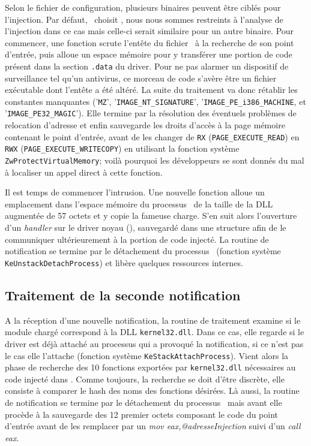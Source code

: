 Selon le fichier de configuration, plusieurs binaires peuvent être ciblés pour l'injection. Par défaut, \Duqu\ choisit \service, nous nous sommes restreints à l'analyse de l'injection dans ce cas mais celle-ci serait similaire pour un autre binaire.
Pour commencer, une fonction scrute l'entête du fichier \service\ à la recherche de son point d'entrée, puis alloue un espace mémoire pour y transférer une portion de code présent dans la section \texttt{.data} du driver. Pour ne pas alarmer un dispositif de surveillance tel qu'un antivirus, ce morceau de code s'avère être un fichier exécutable dont l'entête a été altéré. La suite du traitement va donc rétablir les constantes manquantes ('\texttt{MZ}', '\texttt{IMAGE\_NT\_SIGNATURE}', '\texttt{IMAGE\_PE\_i386\_MACHINE}, et '\texttt{IMAGE\_PE32\_MAGIC}'). Elle termine par la résolution des éventuels problèmes de relocation d'adresse et enfin sauvegarde les droits d'accès à la page mémoire contenant le point d'entrée, avant de les changer de \texttt{RX} (\texttt{PAGE\_EXECUTE\_READ}) en \texttt{RWX} (\texttt{PAGE\_EXECUTE\_WRITECOPY}) en utilisant la fonction système \texttt{ZwProtectVirtualMemory}; voilà pourquoi les développeurs se sont donnés du mal à localiser un appel direct à cette fonction.

Il est temps de commencer l'intrusion. Une nouvelle fonction alloue un emplacement dans l'espace mémoire du processus \service\ 
de la taille de la DLL augmentée de 57 octets et y copie la fameuse charge. S'en suit alors l'ouverture d'un \emph{handler} sur le driver noyau (\driver), sauvegardé dans une structure afin de le communiquer ultérieurement à la portion de code injecté. La routine de notification se termine par le détachement du processus \service\ (fonction système \texttt{KeUnstackDetachProcess}) et libère quelques ressources internes.

\subsection{Traitement de la seconde notification}
A la réception d'une nouvelle notification, la routine de traitement examine si le module chargé correspond à la DLL \texttt{kernel32.dll}. Dans ce cas, elle regarde si le driver est déjà attaché au processus qui a provoqué la notification, si ce n'est pas le cas elle l'attache (fonction système \texttt{KeStackAttachProcess}). Vient alors la phase de recherche des 10 fonctions exportées par \texttt{kernel32.dll} nécessaires au code injecté dans \service. Comme toujours, la recherche se doit d'être discrète, elle consiste à comparer le hash des noms des fonctions désirées.
Là aussi, la routine de notification se termine par le détachement du processus \service\ mais avant elle procède à la sauvegarde des 12 premier octets composant le code du point d'entrée avant de les remplacer par un \emph{mov eax,@adresseInjection} suivi d'un  \emph{call eax}.

